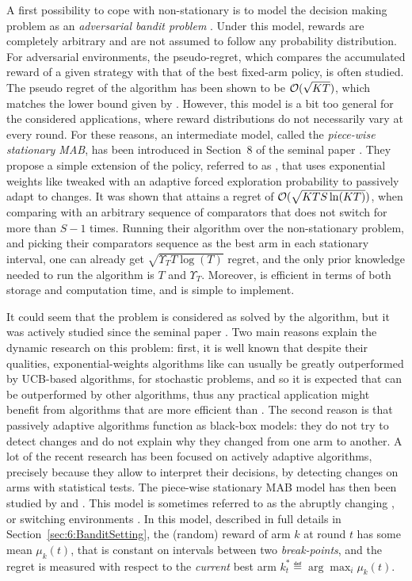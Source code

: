 A first possibility to cope with non-stationary is to model the decision making problem as an \emph{adversarial bandit problem} \cite{Auer02NonStochastic}. Under this model, rewards are completely arbitrary and are not assumed to follow any probability distribution.
For adversarial environments, the pseudo-regret, which compares the accumulated reward of a given strategy with that of the best fixed-arm policy, is often studied. The pseudo regret of the \ExpThree{} algorithm has been shown to be $\mathcal{O}(\sqrt{KT})$, which matches the lower bound given by \cite{Auer02NonStochastic}.
However, this model is a bit too general for the considered applications, where reward distributions do not necessarily vary at every round.
For these reasons, an intermediate model, called the \emph{piece-wise stationary MAB}, has been introduced in Section~8 of the seminal paper \cite{Auer02NonStochastic}.
They propose a simple extension of the \ExpThree{} policy, referred to as \ExpThreeS, that uses exponential weights like \ExpThree{} tweaked with an adaptive forced exploration probability to passively adapt to changes.
It was shown that \ExpThreeS{} attains a regret of $\mathcal{O}(\sqrt{K T S \ln(K T)})$, when comparing with an arbitrary sequence of comparators that does not switch for more than $S-1$ times.
Running their algorithm over the non-stationary problem, and picking their comparators sequence as the best arm in each stationary interval, one can already get $\sqrt{\Upsilon_T T \log(T)}$ regret, and the only prior knowledge needed to run the \ExpThreeS{} algorithm is $T$ and $\Upsilon_T$. Moreover, \ExpThreeS{} is efficient in terms of both storage and computation time, and is simple to implement.

It could seem that the problem is considered as solved by the \ExpThreeS{} algorithm, but it was actively studied since the seminal paper \cite{Auer02NonStochastic}.
Two main reasons explain the dynamic research on this problem:
first, it is well known that despite their qualities, exponential-weights algorithms like \ExpThree{} can usually be greatly outperformed by UCB-based algorithms, for stochastic problems, and so it is expected that \ExpThreeS{} can be outperformed by other algorithms, thus any practical application might benefit from algorithms that are more efficient than \ExpThreeS.
%
The second reason is that passively adaptive algorithms function as black-box models: they do not try to detect changes and do not explain why they changed from one arm to another. A lot of the recent research has been focused on actively adaptive algorithms, precisely because they allow to interpret their decisions, by detecting changes on arms with statistical tests.
The piece-wise stationary MAB model has then been studied by \cite{Kocsis06} and \cite{YuMannor09}.
%
This model is sometimes referred to as the abruptly changing \cite{WeiSrivastava18Abruptly}, or switching environments \cite{MellorShapiro13}.
%
In this model, described in full details in Section~\ref{sec:6:BanditSetting}, the (random) reward of arm $k$ at round $t$ has some mean $\mu_k(t)$, that is constant on intervals between two \emph{break-points}, and the regret is measured with respect to the \emph{current} best arm $k_t^* \eqdef \arg\max_i \mu_k(t)$.

